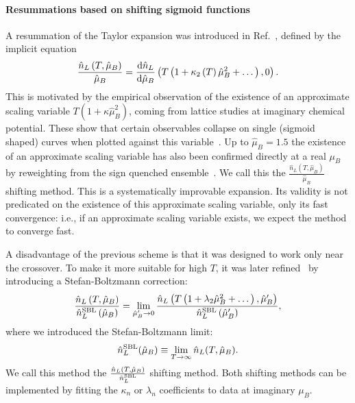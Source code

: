 \documentclass[twocolumn,showpacs,preprintnumbers,amsmath,amssymb,latexsym,prl,footinbib,floatfix,superscriptaddress]{revtex4-2}
\begin{document}
\paragraph{Resummations based on shifting sigmoid functions}
A resummation of the Taylor expansion was introduced in Ref.~\cite{Borsanyi:2021sxv}, defined by the implicit equation
\begin{equation}
    \label{eq:kappaRESUM}
    \frac{\hat{n}_L \left( T, \hat{\mu}_B \right)}{\hat{\mu}_B} = \frac{{\rm{d}} \hat{n}_L}{{\rm{d}} \hat{\mu}_B} \left( T\left( 1 + \kappa_2 \left( T \right) \hat{\mu}_B^2 + \dots \right), 0 \right) \rm{.}
\end{equation}
This is motivated by the empirical observation of 
the existence of an approximate scaling variable $T (1 + \kappa \hat{\mu}_B^2 )$, coming 
from lattice studies at imaginary chemical potential.  These show that certain observables collapse on 
single (sigmoid shaped) curves when plotted against this variable~\cite{Borsanyi:2020fev,Borsanyi:2021sxv}.
Up to $\hat{\mu}_B=1.5$ the existence of an approximate scaling variable 
has also been confirmed directly at a real $\mu_B$ 
by reweighting from the sign quenched 
ensemble~\cite{Borsanyi:2021hbk}. We call this 
the $\frac{\hat{n}_L \left( T, \hat{\mu}_B \right)}{\hat{\mu}_B}$ 
shifting method. 
This is a systematically improvable 
expansion. 
Its validity is not predicated on the existence of this 
approximate scaling variable, only its fast convergence: i.e., 
if an approximate scaling variable exists, we expect the method to
converge fast.

A disadvantage of the previous 
scheme is that it was designed 
to work only near the crossover. 
To make it more suitable for 
high $T$, it was later refined~\cite{Borsanyi:2022qlh} by introducing a Stefan-Boltzmann correction: 
\begin{equation}
    \label{eq:lambdaRESUM}
    \frac{\hat{n}_L \left( T, \hat{\mu}_B \right)}{\hat{n}_L^{\rm{SBL}}\left(\hat{\mu}_B\right)} = \lim_{\hat{\mu}_B' \to 0} \frac{\hat{n}_L \left( T\left( 1 + \lambda_2 \hat{\mu}_B^2 + \dots \right), \hat{\mu}_B' \right) }{\hat{n}_L^{\rm{SBL}}\left( \hat{\mu}_B' \right)} \rm{,}
\end{equation}
where we introduced the Stefan-Boltzmann limit:
\begin{equation}
    \hat{n}_L^{\rm{SBL}}(\hat{\mu}_B) \equiv \lim_{T \to \infty} \hat{n}_L(T, \hat{\mu}_B) \rm{.}
\end{equation}
We call this 
method the $\frac{\hat{n}_L \left( T, \hat{\mu}_B \right)}{\hat{n}_L^{\rm{SBL}}}$ 
shifting method. Both shifting methods can be implemented by fitting the 
$\kappa_n$ or $\lambda_n$ coefficients to data at imaginary $\mu_B$.
\end{document}
